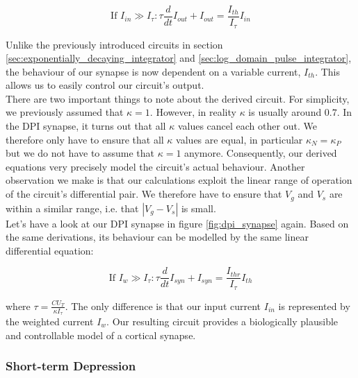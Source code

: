\begin{equation}
    \text{If $I_{in} \gg I_{\tau}$}: \tau \frac{d}{dt} I_{out} + I_{out} = \frac{I_{th}}{I_{\tau}} I_{in}
\end{equation}

Unlike the previously introduced circuits in section \ref{sec:exponentially_decaying_integrator} and \ref{sec:log_domain_pulse_integrator}, the behaviour of our synapse is now dependent on a variable current, $I_{th}$. This allows us to easily control our circuit's output.\\

There are two important things to note about the derived circuit. For simplicity, we previously assumed that $\kappa = 1$. However, in reality $\kappa$ is usually around $0.7$. In the DPI synapse, it turns out that all $\kappa$ values cancel each other out. We therefore only have to ensure that all $\kappa$ values are equal, in particular $\kappa_N = \kappa_P$ but we do not have to assume that $\kappa = 1$ anymore. Consequently, our derived equations very precisely model the circuit's actual behaviour. Another observation we make is that our calculations exploit the linear range of operation of the circuit's differential pair. We therefore have to ensure that $V_g$ and $V_s$ are within a similar range, i.e. that $|V_g - V_s|$ is small.\\

Let's have a look at our DPI synapse in figure \ref{fig:dpi_synapse} again. Based on the same derivations, its behaviour can be modelled by the same linear differential equation:

\begin{equation}
    \text{If $I_w \gg I_{\tau}$}: \tau \frac{d}{dt} I_{syn} + I_{syn} = \frac{I_{thr}}{I_{\tau}} I_{th}
\end{equation}

where $\tau = \frac{C U_T}{\kappa I_{\tau}}$. The only difference is that our input current $I_{in}$ is represented by the weighted current $I_w$. Our resulting circuit provides a biologically plausible and controllable model of a cortical synapse.

\subsubsection{Short-term Depression}\label{sec:short_term_depression}


